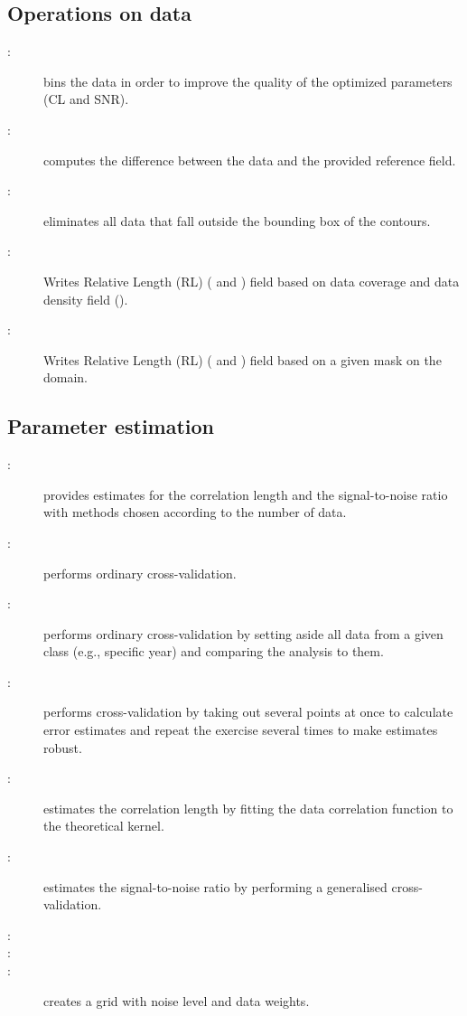 \subsection{Operations on data}

\begin{description}
\item[:] bins the data in order to improve the quality of the optimized parameters (CL and SNR).
\item[:] computes the difference between the data and the provided reference field. 
\item[:] eliminates all data that fall outside the bounding box of the contours.
\item[:] Writes Relative Length (RL) ( and ) field based on data coverage and data density field ().
\item[:] Writes Relative Length (RL) ( and ) field based on a given mask on the domain.  
\end{description}


\subsection{Parameter estimation}

\begin{description}
\item[:] provides estimates for the correlation length and the signal-to-noise ratio with methods chosen according to the number of data.
\item[:] performs ordinary cross-validation.
\item[:] performs ordinary cross-validation by setting aside all data from a given class (e.g., specific year) and comparing the analysis to them.
\item[:] performs cross-validation by taking out several points at once to calculate error estimates and repeat the exercise several times to make estimates robust.
\item[:] estimates the correlation length by fitting the data correlation function to the theoretical kernel. 
\item[:] estimates the signal-to-noise ratio by performing a generalised cross-validation.
\item[:] 
\item[:] 
\item[:] creates a grid with noise level and data weights.
\end{description}

